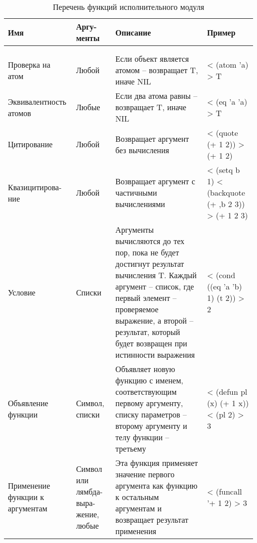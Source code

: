 \begin{xltabular}{\textwidth}{|p{3.6cm}|p{1.8cm}|p{6cm}|X|}
	\caption{Перечень функций исполнительного модуля\label{funcprimeval:table}}\\ \hline
	\centrow Имя & \centrow Аргу- \linebreak менты & \centrow Описание & \centrow Пример \\ \hline
	 &  &  &  \\ \hline
	\endfirsthead
	 &  &  &  \\ \hline
	\finishhead
	Проверка на атом & Любой & Если объект является атомом -- возвращает T, иначе NIL & < (atom 'a) \linebreak > T \\ \hline 
	Эквивалентность атомов & Любые & Если два атома равны -- возвращает T, иначе NIL & < (eq 'a 'a) \linebreak > T \\ \hline 
	Цитирование & Любой & Возвращает аргумент без вычисления & < (quote (+ 1 2)) \linebreak > (+ 1 2) \\ \hline 
	Квазицитирова-\linebreak ние & Любой & Возвращает аргумент с частичными вычислениями & < (setq b 1) \linebreak < (backquote (+ ,b 2 3)) \linebreak > (+ 1 2 3) \\ \hline 
	Условие & Списки & Аргументы вычисляются до тех пор, пока не будет достигнут результат вычисления T. Каждый аргумент -- список, где первый элемент -- проверяемое выражение, а второй -- результат, который будет возвращен при истинности выражения & < (cond ((eq 'a 'b) 1) (t 2)) \linebreak > 2 \\ \hline 
	Объявление функции & Символ, списки & Объявляет новую функцию с именем, соответствующим первому аргументу, списку параметров -- второму аргументу и телу функции -- третьему & < (defun pl (x) (+ 1 x)) \linebreak < (pl 2) \linebreak > 3 \\ \hline 
	Применение функции к аргументам & Символ или лямбда-выра- \linebreak жение, любые & Эта функция применяет значение первого аргумента как функцию к остальным аргументам и возвращает результат применения & < (funcall '+ 1 2) \linebreak > 3 \\ \hline 

\end{xltabular}
